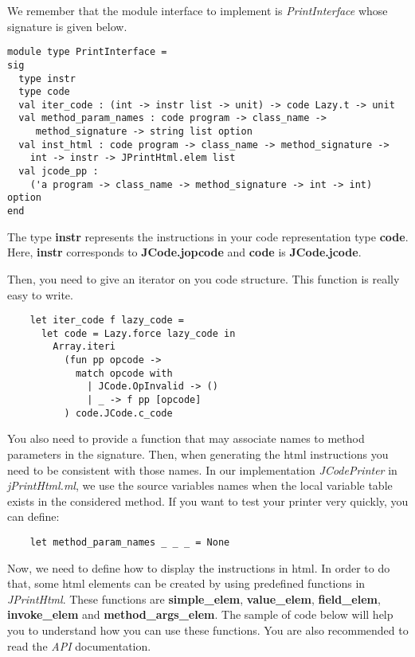 \documentclass{article}
\begin{document}
We remember that the module interface to implement is
\emph{PrintInterface} whose signature is given below.

\begin{verbatim}
module type PrintInterface =
sig
  type instr
  type code
  val iter_code : (int -> instr list -> unit) -> code Lazy.t -> unit
  val method_param_names : code program -> class_name ->
     method_signature -> string list option
  val inst_html : code program -> class_name -> method_signature ->
    int -> instr -> JPrintHtml.elem list
  val jcode_pp :
    ('a program -> class_name -> method_signature -> int -> int) option
end
\end{verbatim}
The type \textbf{instr} represents the instructions in your code
representation type \textbf{code}. Here, \textbf{instr} corresponds
to \textbf{JCode.jopcode} and \textbf{code} is
\textbf{JCode.jcode}.

Then, you need to give an iterator on you code structure. This
function is really easy to write.

\begin{verbatim}
    let iter_code f lazy_code =
      let code = Lazy.force lazy_code in
        Array.iteri
          (fun pp opcode ->
            match opcode with
              | JCode.OpInvalid -> ()
              | _ -> f pp [opcode]
          ) code.JCode.c_code
\end{verbatim}
You also need to provide a function that may associate names to
method parameters in the signature. Then, when generating the html
instructions you need to be consistent with those names. In our
implementation \emph{JCodePrinter} in \emph{jPrintHtml.ml}, we use
the source variables names when the local variable table exists in
the considered method. If you want to test your printer very
quickly, you can define:

\begin{verbatim}
    let method_param_names _ _ _ = None
\end{verbatim}
Now, we need to define how to display the instructions in html. In
order to do that, some html elements can be created by using
predefined functions in \emph{JPrintHtml}. These functions are
\textbf{simple\_elem}, \textbf{value\_elem}, \textbf{field\_elem},
\textbf{invoke\_elem} and \textbf{method\_args\_elem}. The sample
of code below will help you to understand how you can use these
functions. You are also recommended to read the \emph{API}
documentation.
\end{document}
